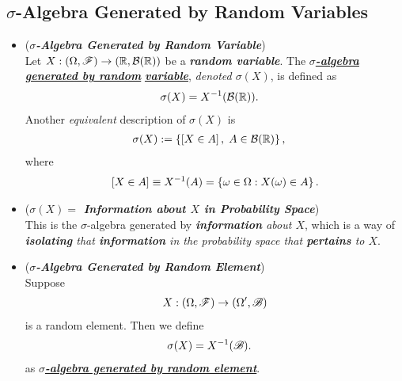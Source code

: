 \documentclass[11pt]{article}
\begin{document}
\subsection{$\sigma$-Algebra Generated by Random Variables}
\begin{itemize}
\item  \begin{definition} (\emph{\textbf{$\sigma$-Algebra Generated by Random Variable}})\\
Let $X: (\Omega, {\mathscr F}) \rightarrow ({\mathbb R}, {\mathcal B}({\mathbb R}))$  be a \emph{\textbf{random variable}}. The \underline{\emph{\textbf{$\sigma$-algebra generated by random}}} \underline{\emph{\textbf{variable}}}, \emph{denoted $\sigma(X)$}, is defined as
\begin{align*}
\sigma(X) &= X^{-1}({\mathcal B}({\mathbb R})).
\end{align*}
Another \emph{equivalent} description of $\sigma(X)$ is
\begin{align*}
\sigma(X) &:= \left\{ \left[X \in A\right],\; A \in {\mathcal B}({\mathbb R})  \right\},
\end{align*} where 
\begin{align*}
 \left[X \in A\right] \equiv X^{-1}(A) = \left\{\omega \in \Omega: X(\omega) \in A\right\}.
\end{align*}
\end{definition}

\item \begin{remark} (\emph{\textbf{$\sigma(X) =$ Information about $X$ in Probability Space}})\\
This is the $\sigma$-algebra generated by \emph{\textbf{information} about $X$}, which is a way of \emph{\textbf{isolating} that \textbf{information} in the probability space that \textbf{pertains} to $X$}. 
\end{remark}

\item \begin{definition} (\emph{\textbf{$\sigma$-Algebra Generated by Random Element}})\\
Suppose
\begin{align*}
X: (\Omega, {\mathscr F}) \rightarrow (\Omega', {\mathscr B})
\end{align*} is a random element. Then we define
\begin{align*}
\sigma(X) &= X^{-1}({\mathscr B}).
\end{align*} as  \underline{\emph{\textbf{$\sigma$-algebra generated by random element}}}.
\end{definition}


\end{itemize}
\end{document}
